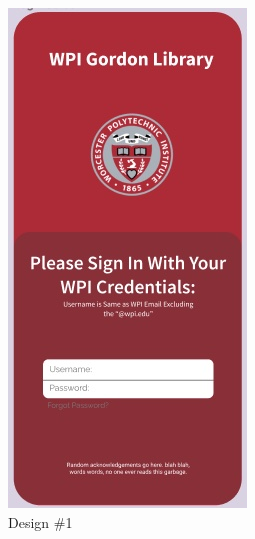\begin{figure}[H]
    \centering
    \begin{subfigure}{0.33\textwidth}
        \centering
        \includegraphics[width=0.6\linewidth]{assets/img/login_1.jpg}
        \caption{Design \#1}
        \label{fig:login_screens_1}
    \end{subfigure}%
    \begin{subfigure}{0.33\textwidth}
        \centering

\end{subfigure}
\end{figure}
